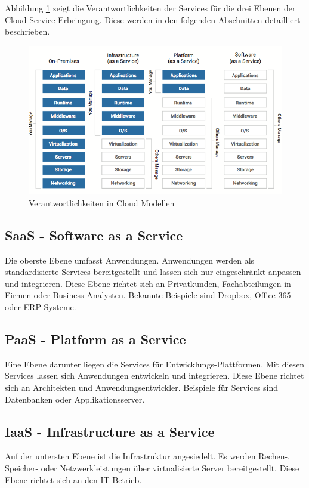 Abbildung \ref{fig:cloud-modelle} zeigt die Verantwortlichkeiten der Services für die drei Ebenen der Cloud-Service Erbringung. Diese werden in den folgenden Abschnitten detailliert beschrieben. 

\begin{figure}
\centering
\includegraphics[width=0.7\linewidth]{fig/cloud-modelle}
\caption{Verantwortlichkeiten in Cloud Modellen}
\label{fig:cloud-modelle}
\end{figure}

\subsection{SaaS - Software as a Service}
Die oberste Ebene umfasst Anwendungen. Anwendungen werden als standardisierte Services bereitgestellt und lassen sich nur eingeschränkt anpassen und integrieren. Diese Ebene richtet sich an Privatkunden, Fachabteilungen in Firmen oder Business Analysten. Bekannte Beispiele sind Dropbox, Office 365 oder ERP-Systeme.

\subsection{PaaS - Platform as a Service}
Eine Ebene darunter liegen die Services für Entwicklungs-Plattformen. Mit diesen Services lassen sich Anwendungen entwickeln und integrieren. Diese Ebene richtet sich an Architekten und Anwendungsentwickler. Beispiele für Services sind Datenbanken oder Applikationsserver.

\subsection{IaaS - Infrastructure as a Service}
Auf der untersten Ebene ist die Infrastruktur angesiedelt. Es werden Rechen-, Speicher- oder Netzwerkleistungen über virtualisierte Server bereitgestellt. Diese Ebene richtet sich an den IT-Betrieb.

